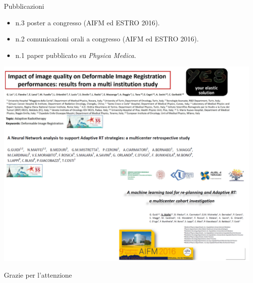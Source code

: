 \documentclass{beamer}
\begin{document}
\begin{frame}[t]{Pubblicazioni}
\begin{itemize}
\tiny
\item n.3 poster a congresso (AIFM ed ESTRO 2016).
\item n.2 comunicazioni orali a congresso (AIFM ed ESTRO 2016).
\item n.1 paper pubblicato su \textit{Physica Medica}.
\end{itemize}
\begin{center}
\includegraphics[width=.9\textwidth]{./img/Pub2.png}
\end{center}
\end{frame}

\begin{frame}
\centering
\Huge Grazie per l'attenzione
\end{frame}




\end{document}
